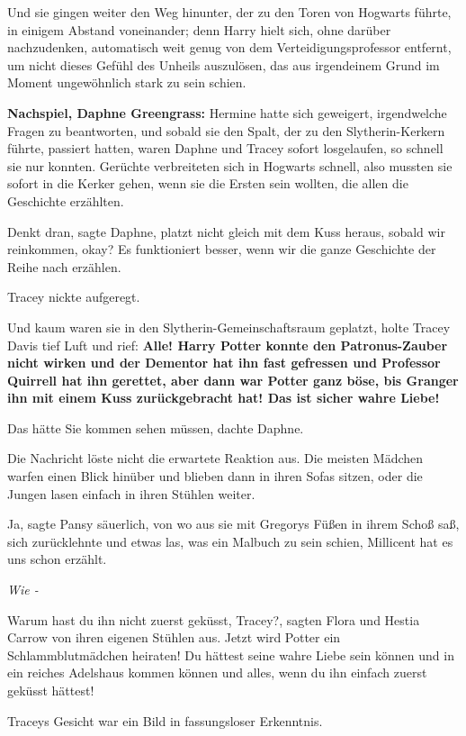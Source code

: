 Und sie gingen weiter den Weg hinunter, der zu den Toren von Hogwarts führte, in
einigem Abstand voneinander; denn Harry hielt sich, ohne darüber nachzudenken,
automatisch weit genug von dem Verteidigungsprofessor entfernt, um nicht dieses
Gefühl des Unheils auszulösen, das aus irgendeinem Grund im Moment ungewöhnlich
stark zu sein schien.

\textbf{Nachspiel, Daphne Greengrass:}
Hermine hatte sich geweigert, irgendwelche Fragen zu beantworten, und sobald sie
den Spalt, der zu den Slytherin-Kerkern führte, passiert hatten, waren Daphne
und Tracey sofort losgelaufen, so schnell sie nur konnten. Gerüchte verbreiteten
sich in Hogwarts schnell, also mussten sie sofort in die Kerker gehen, wenn sie
die Ersten sein wollten, die allen die Geschichte erzählten.

\glqq{}Denkt dran\grqq{}, sagte Daphne, \glqq{}platzt nicht gleich mit dem Kuss
heraus, sobald wir reinkommen, okay? Es funktioniert besser, wenn wir die ganze
Geschichte der Reihe nach erzählen.\grqq{}

Tracey nickte aufgeregt.

Und kaum waren sie in den Slytherin-Gemeinschaftsraum geplatzt, holte Tracey
Davis tief Luft und rief: \glqq{}\textbf{Alle! Harry Potter konnte den
Patronus-Zauber nicht wirken und der Dementor hat ihn fast gefressen und
Professor Quirrell hat ihn gerettet, aber dann war Potter ganz böse, bis Granger
ihn mit einem Kuss zurückgebracht hat! Das ist sicher wahre Liebe!}\grqq{}

Das hätte Sie kommen sehen müssen, dachte Daphne.

Die Nachricht löste nicht die erwartete Reaktion aus. Die meisten Mädchen warfen
einen Blick hinüber und blieben dann in ihren Sofas sitzen, oder die Jungen
lasen einfach in ihren Stühlen weiter.

\glqq{}Ja\grqq{}, sagte Pansy säuerlich, von wo aus sie mit Gregorys Füßen in
ihrem Schoß saß, sich zurücklehnte und etwas las, was ein Malbuch zu sein
schien, \glqq{}Millicent hat es uns schon erzählt.\grqq{}

\emph{Wie -}

\glqq{}Warum hast du ihn nicht zuerst geküsst, Tracey?\grqq{}, sagten Flora und
Hestia Carrow von ihren eigenen Stühlen aus. \glqq{}Jetzt wird Potter ein
Schlammblutmädchen heiraten! Du hättest seine wahre Liebe sein können und in ein
reiches Adelshaus kommen können und alles, wenn du ihn einfach zuerst geküsst
hättest!\grqq{}

Traceys Gesicht war ein Bild in fassungsloser Erkenntnis.

